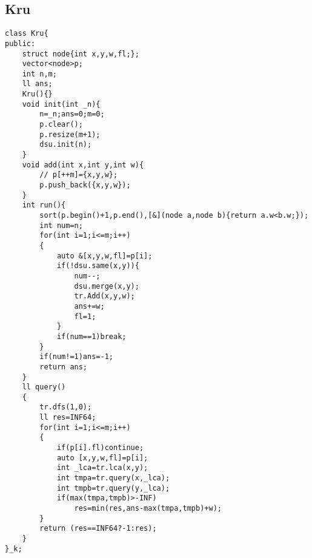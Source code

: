 \documentclass[12pt, a4paper, oneside]{ctexart}
\begin{document}
\newpage 
\subsection{Kru} 
\begin{lstlisting}
class Kru{
public:
	struct node{int x,y,w,fl;};
	vector<node>p;
	int n,m;
	ll ans;
	Kru(){}
	void init(int _n){
		n=_n;ans=0;m=0;
		p.clear();
		p.resize(m+1);
		dsu.init(n);
	}
	void add(int x,int y,int w){
		// p[++m]={x,y,w};
		p.push_back({x,y,w});
	}
	int run(){
		sort(p.begin()+1,p.end(),[&](node a,node b){return a.w<b.w;});
		int num=n;
		for(int i=1;i<=m;i++)
		{
			auto &[x,y,w,fl]=p[i];
			if(!dsu.same(x,y)){
				num--;
				dsu.merge(x,y);
				tr.Add(x,y,w);
				ans+=w;
				fl=1;
			}
			if(num==1)break;
		}
		if(num!=1)ans=-1;
		return ans;
	}
	ll query()
	{
		tr.dfs(1,0);
		ll res=INF64;
		for(int i=1;i<=m;i++)
		{
			if(p[i].fl)continue;
			auto [x,y,w,fl]=p[i];
			int _lca=tr.lca(x,y);
			int tmpa=tr.query(x,_lca);
			int tmpb=tr.query(y,_lca);
			if(max(tmpa,tmpb)>-INF)
				res=min(res,ans-max(tmpa,tmpb)+w);
		}
		return (res==INF64?-1:res);
	}
}_k;
\end{lstlisting}
\end{document}
